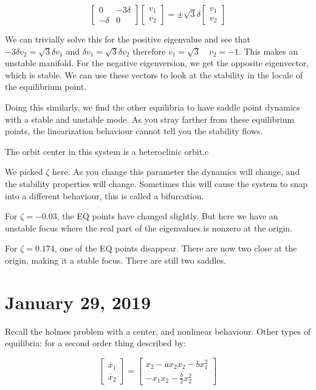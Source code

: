 \documentclass[11pt]{article}
\begin{document}
\begin{equation}
\begin{bmatrix}
0 & -3\delta \\
-\delta & 0
\end{bmatrix}
\begin{bmatrix}
v_1 \\
v_2
\end{bmatrix} = 
\pm \sqrt{3}\delta
\begin{bmatrix}
v_1 \\
v_2
\end{bmatrix}
\end{equation}

We can trivially solve this for the positive eigenvalue and see that $-3\delta v_2 = \sqrt{3}\delta v_1$ and $\delta v_1 = \sqrt{3}\delta v_2$ therefore $v_1 = \sqrt{3} \quad v_2 = -1$. This makes an unstable manifold. For the negative eigenversion, we get the opposite eigenvector, which is stable. We can use these vectors to look at the stability in the locale of the equilibrium point.

Doing this similarly, we find the other equilibria to have saddle point dynamics with a stable and unstable mode. As you stray farther from these equilibrium points, the linearization behaviour cannot tell you the stability flows.

The orbit center in this system is a heteroclinic orbit.c

We picked $\zeta$ here. As you change this parameter the dynamics will change, and the stability properties will change. Sometimes this will cause the system to snap into a different behaviour, this is called a bifurcation.

For $\zeta = -0.03$, the EQ points have changed slightly. But here we have an unstable focus where the real part of the eigenvalues is nonzero at the origin.

For $\zeta = 0.174$, one of the EQ points disappear. There are now two close at the origin, making it a stable focus. There are still two saddles.




\section*{January 29, 2019}
Recall the holmes problem with a center, and nonlinear behaviour. Other types of equilibria: for a second order thing described by:


\begin{equation}
\begin{bmatrix}
\dot{x_1} \\
\dot{x_2}
\end{bmatrix}
=
\begin{bmatrix}
x_2 -ax_2x_2 -bx_1^2\\
-x_1x_2 -\frac{b}{2}x_2^2
\end{bmatrix}
\end{equation}
\end{document}

